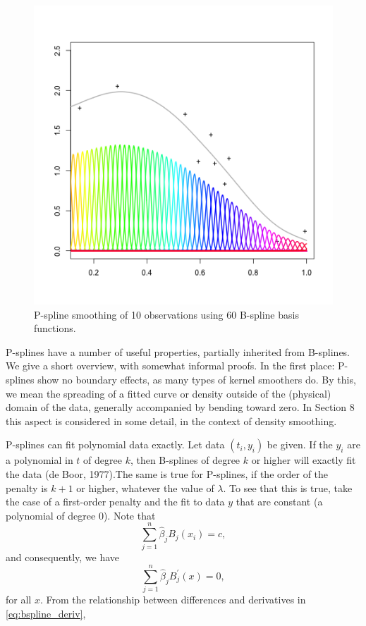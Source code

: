 \documentclass[12pt]{article}
\newcommand*\needsparaphrased{\color{red}}
\newcommand*\needsproof{\color{blue}}
\begin{document}
\begin{figure}[H]   \label{fig:overcomplete_basis_pspline}
  \centering
   \graphicspath{{img/}}
  \includegraphics[scale=0.75]{pspline_10obs_60_basis_functions.png}
  \caption{P-spline smoothing of 10 observations using 60 B-spline basis functions.}
\end{figure}


{\needsparaphrased P-splines have a number of useful properties, partially inherited from B-splines. We give a short overview, with somewhat informal proofs. In the first place: P-splines show no boundary effects, as many types of kernel smoothers do. By this, we mean the spreading of a fitted curve or density outside of the (physical) domain of the data, generally accompanied by bending toward zero. In Section 8 this aspect is considered in some detail, in the context of density smoothing. }

P-splines can fit polynomial data exactly. Let data $\left(t_i,y_i\right)$ be given. {\needsproof If the $y_i$ are a polynomial in $t$ of degree $k$, then B-splines of degree $k$ or higher will exactly fit the data (de Boor, 1977).}The same is true for P-splines, if the order of the penalty is $k +1$ or higher, whatever the value of $\lambda$. To see that this is true, take the case of a first-order penalty and the fit to data $y$ that are constant (a polynomial of degree 0). Note that 
\[
\sum_{j=1}^n \hat{\beta}_j B_j\left( x_i \right) = c, 
\]
\noindent
and consequently, we have 
\[
\sum_{j=1}^n \hat{\beta}_j B^\prime_j\left( x \right) = 0, 
\]
\noindent
for all $x$. From the relationship between differences and derivatives in \ref{eq:bspline_deriv}, 
\end{document}
